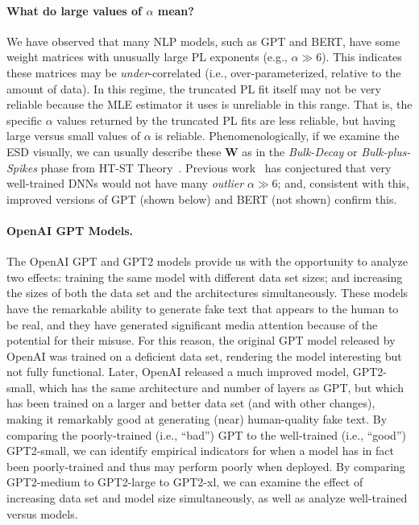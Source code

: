 \vspace{-1mm}
\paragraph{What do large values of $\alpha$ mean?}

We have observed that many NLP models, such as GPT and BERT, have some weight matrices with unusually large PL exponents (e.g., $\alpha\gg 6$).
This indicates these matrices may be \emph{under}-correlated (i.e., over-parameterized, relative to the amount of data).
In this regime, the truncated PL fit itself may not be very reliable because the MLE estimator it uses is unreliable in this range.
That is, the specific $\alpha$ values returned by the truncated PL fits are less reliable, but having large versus small values of $\alpha$ is reliable.
Phenomenologically, if we examine the ESD visually, we can usually describe these $\mathbf{W}$ as in the \emph{Bulk-Decay} or \emph{Bulk-plus-Spikes} phase from HT-ST Theory~\cite{MM18_TR,MM19_HTSR_ICML}.
Previous work~\cite{MM18_TR,MM19_HTSR_ICML} has conjectured that very well-trained DNNs would not have many \emph{outlier} $\alpha\gg 6$; and, consistent with this, improved versions of GPT (shown below) and BERT (not shown) confirm this.


\vspace{-1mm}
\paragraph{OpenAI GPT Models.}

The OpenAI GPT and GPT2 models provide us with the opportunity to analyze two effects: training the same model with different data set sizes; and increasing the sizes of both the data set and the architectures simultaneously.
These models have the remarkable ability to generate fake text that appears to the human to be real, and they have generated significant media attention because of the potential for their misuse.
For this reason, the original GPT model released by OpenAI was trained on a deficient data set, rendering the model interesting but not fully functional.  
Later, OpenAI released a much improved model, GPT2-small, which has the same architecture and number of layers as GPT, but which has been trained on a larger and better data set (and with other changes), making it remarkably good at generating (near) human-quality fake text.  
%
By comparing the poorly-trained (i.e., ``bad'') GPT to the well-trained (i.e., ``good'') GPT2-small, we can identify empirical indicators for when a model has in fact been poorly-trained and thus may perform poorly when deployed.
By comparing GPT2-medium to GPT2-large to GPT2-xl, we can examine the effect of increasing data set and model size simultaneously, as well as analyze well-trained versus  models.

